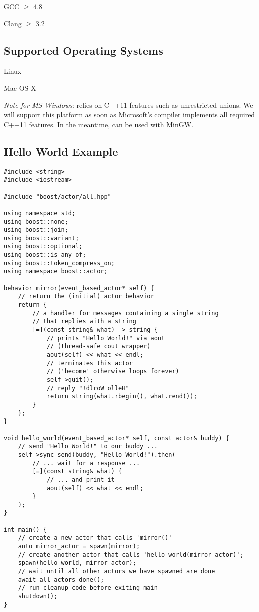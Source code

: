 \begin{itemize*}
  \item GCC $\ge$ 4.8
  \item Clang $\ge$ 3.2
\end{itemize*}

\subsection{Supported Operating Systems}

\begin{itemize*}
\item Linux
\item Mac OS X
\item \textit{Note for MS Windows}:
\lib relies on C++11 features such as unrestricted unions.
We will support this platform as soon as Microsoft's compiler implements all required C++11 features.
In the meantime, \lib can be used with MinGW.
\end{itemize*}

\clearpage
\subsection{Hello World Example}

\begin{lstlisting}
#include <string>
#include <iostream>

#include "boost/actor/all.hpp"

using namespace std;
using boost::none;
using boost::join;
using boost::variant;
using boost::optional;
using boost::is_any_of;
using boost::token_compress_on;
using namespace boost::actor;

behavior mirror(event_based_actor* self) {
    // return the (initial) actor behavior
    return {
        // a handler for messages containing a single string
        // that replies with a string
        [=](const string& what) -> string {
            // prints "Hello World!" via aout
            // (thread-safe cout wrapper)
            aout(self) << what << endl;
            // terminates this actor
            // ('become' otherwise loops forever)
            self->quit();
            // reply "!dlroW olleH"
            return string(what.rbegin(), what.rend());
        }
    };
}

void hello_world(event_based_actor* self, const actor& buddy) {
    // send "Hello World!" to our buddy ...
    self->sync_send(buddy, "Hello World!").then(
        // ... wait for a response ...
        [=](const string& what) {
            // ... and print it
            aout(self) << what << endl;
        }
    );
}

int main() {
    // create a new actor that calls 'mirror()'
    auto mirror_actor = spawn(mirror);
    // create another actor that calls 'hello_world(mirror_actor)';
    spawn(hello_world, mirror_actor);
    // wait until all other actors we have spawned are done
    await_all_actors_done();
    // run cleanup code before exiting main
    shutdown();
}
\end{lstlisting}
